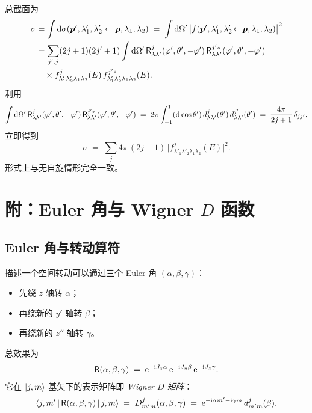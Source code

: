 总截面为
\begin{align}
  \sigma &= \int \mathrm{d}\sigma(\bm p',\lambda'_1,\lambda'_2 \leftarrow \bm p,\lambda_1,\lambda_2)
  \;=\; \int \mathrm{d}\Omega'\, \big|f(\bm p',\lambda'_1,\lambda'_2 \!\leftarrow\! \bm p,\lambda_1,\lambda_2)\big|^2 \notag\\
  &= \sum_{j',j}(2j+1)(2j'+1)\int \mathrm{d}\Omega'\,
     \mathsf{R}^{j}_{\lambda\lambda'}(\varphi',\theta',-\varphi')\,
     \mathsf{R}^{j'*}_{\lambda\lambda'}(\varphi',\theta',-\varphi')\notag\\
  &\quad\times f^{j}_{\lambda'_1\lambda'_2\lambda_1\lambda_2}(E)\,
     f^{j'*}_{\lambda'_1\lambda'_2\lambda_1\lambda_2}(E).
\end{align}
利用
\begin{equation}
  \int \mathrm{d}\Omega'\, \mathsf{R}^{j}_{\lambda\lambda'}(\varphi',\theta',-\varphi')\,
        \mathsf{R}^{j'*}_{\lambda\lambda'}(\varphi',\theta',-\varphi')
  \;=\; 2\pi \int_{-1}^{1} (\mathrm{d}\cos\theta')\, d^{j}_{\lambda\lambda'}(\theta')\,d^{j'}_{\lambda\lambda'}(\theta')
  \;=\; \frac{4\pi}{2j+1}\,\delta_{jj'},
  \label{eq:R-orth-int}
\end{equation}
立即得到
\begin{equation}
  \sigma \;=\; \sum_j 4\pi\,(2j+1)\,\big|f^{j}_{\lambda'_1\lambda'_2\lambda_1\lambda_2}(E)\big|^2.
  \label{eq:sigma-pw}
\end{equation}
形式上与无自旋情形完全一致。

\section{附：Euler 角与 Wigner $D$ 函数}
\label{sec:wigner-D}

\subsection{Euler 角与转动算符}

描述一个空间转动可以通过三个 Euler 角 $(\alpha,\beta,\gamma)$：
\begin{itemize}
  \item 先绕 $z$ 轴转 $\alpha$；
  \item 再绕新的 $y'$ 轴转 $\beta$；
  \item 再绕新的 $z''$ 轴转 $\gamma$。
\end{itemize}
总效果为
\begin{equation}
  \mathsf{R}(\alpha,\beta,\gamma) \;=\; \mathrm{e}^{-\mathrm{i} J_z\alpha}\,\mathrm{e}^{-\mathrm{i} J_y\beta}\,\mathrm{e}^{-\mathrm{i} J_z\gamma}.
  \label{eq:Reuler}
\end{equation}
它在 $\ket{j,m}$ 基矢下的表示矩阵即 \emph{Wigner $D$ 矩阵}：
\begin{equation}
  \left\langle j,m' \,\middle|\, \mathsf{R}(\alpha,\beta,\gamma) \,\middle|\, j,m \right\rangle
  \;=\; D^{j}_{m'm}(\alpha,\beta,\gamma)
  \;=\; \mathrm{e}^{-\mathrm{i}\alpha m' - \mathrm{i}\gamma m}\, d^{j}_{m'm}(\beta).
  \label{eq:Dmat}
\end{equation}

